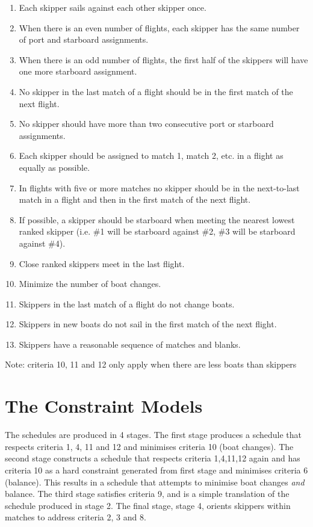\documentclass{llncs}
\begin{document}
\begin{enumerate}
\item Each skipper sails against each other skipper once.
\item When there is an even number of flights, each skipper has the same number of port and starboard assignments. 
\item When there is an odd number of flights, the first half of the skippers will have one more starboard assignment.
\item No skipper in the last match of a flight should be in the first match of the next flight. 
\item No skipper should have more than two consecutive port or starboard assignments.
\item Each skipper should be assigned to match 1, match 2, etc. in a flight as equally as possible.
\item In flights with five or more matches no skipper should be in the next-to-last match in a flight and then in the first match of the next flight.
\item If possible, a skipper should be starboard when meeting the nearest lowest ranked skipper (i.e. \#1 will be starboard against \#2, \#3 will be starboard against \#4).
\item Close ranked skippers meet in the last flight.
\item Minimize the number of boat changes.
\item Skippers in the last match of a flight do not change boats.
\item Skippers in new boats do not sail in the first match of the next flight.
\item Skippers have a reasonable sequence of matches and blanks.
\end{enumerate}

\noindent
Note: criteria 10, 11 and 12 only apply when there are less boats than skippers

\section{The Constraint Models}
The schedules are produced in 4 stages. The first stage produces a schedule that respects criteria 1, 4, 11 and 12 and minimises criteria 10 (boat changes). The second stage constructs a schedule that respects criteria 1,4,11,12 again and has criteria 10 as a hard constraint generated from first stage and minimises criteria 6 (balance). This results in a schedule that attempts to minimise boat changes \emph{and} balance. The third stage satisfies criteria 9, and is a simple translation of the schedule produced in stage 2.  The final stage, stage 4, orients skippers within matches to address criteria 2, 3 and 8. 
\end{document}
